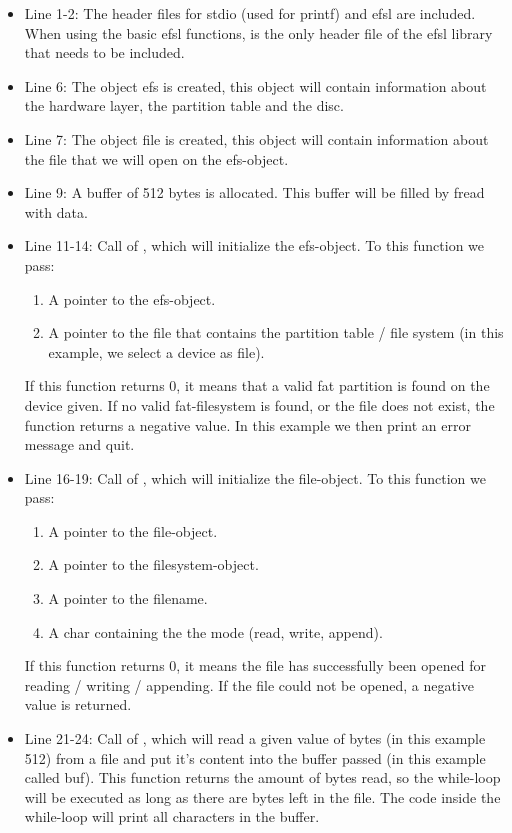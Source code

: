 \begin{itemize}
	\item{Line 1-2: The header files for stdio (used for printf) and efsl
		are included. When using the basic efsl functions,  is
		the only header file of the efsl library that needs to be included.}
	\item{Line 6: The object efs is created, this object will contain
		information about the hardware layer, the partition table and
		the disc.}
	\item{Line 7: The object file is created, this object will contain
		information about the file that we will open on the efs-object.}
	\item{Line 9: A buffer of 512 bytes is allocated. This buffer will
	 	be filled by fread with data.}
	\item{Line 11-14: Call of , which will initialize the efs-object.
		To this function we pass:
		\begin{enumerate}
			\item{A pointer to the efs-object.}
			\item{A pointer to the file that contains the partition table /
				file system (in this example, we select a device as file).}
		\end{enumerate}
		If this function returns 0, it means that a valid fat partition is
		found on the device given.
		If no valid fat-filesystem is found, or the file does not exist, the
		function returns a negative value. In this example we then print an
		error message and quit.}
	\item{Line 16-19: Call of , which will initialize the
		file-object. To this function we pass:
		\begin{enumerate}
			\item{A pointer to the file-object.}
			\item{A pointer to the filesystem-object.}
			\item{A pointer to the filename.}
			\item{A char containing the the mode (read, write, append).}
		\end{enumerate}
		If this function returns 0, it means the file has successfully been
		opened for reading / writing / appending.
		If the file could not be opened, a negative value is returned.
	}
	\item{Line 21-24: Call of , which will read a given value of
		bytes (in this example 512) from a file and put it's content into
		the buffer passed (in this example called buf). This function returns
		the amount of bytes read, so the while-loop will be executed as long
		as there are bytes left in the file. The code inside the while-loop
		will print all characters in the buffer.}
\end{itemize}
